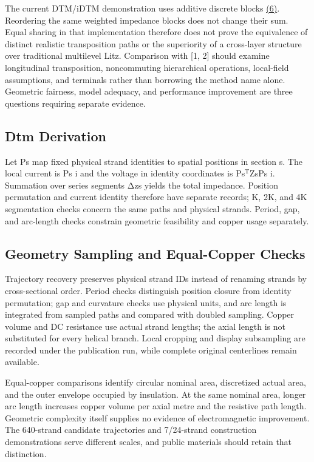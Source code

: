 \documentclass[11pt]{article}
\begin{document}
The current DTM/iDTM demonstration uses additive discrete blocks \href{report_en_single.pdf#E06}{(6)}. Reordering the same weighted impedance blocks does not change their sum. Equal sharing in that implementation therefore does not prove the equivalence of distinct realistic transposition paths or the superiority of a cross-layer structure over traditional multilevel Litz. Comparison with [1, 2] should examine longitudinal transposition, noncommuting hierarchical operations, local-field assumptions, and terminals rather than borrowing the method name alone. Geometric fairness, model adequacy, and performance improvement are three questions requiring separate evidence.


\subsection*{Dtm Derivation}
\hypertarget{05.dtm_derivation.heading}{}
Let Ps map fixed physical strand identities to spatial positions in section s. The local current is Ps i and the voltage in identity coordinates is Ps\(^{\mathrm T}\)ZsPs i. Summation over series segments Δzs yields the total impedance. Position permutation and current identity therefore have separate records; K, 2K, and 4K segmentation checks concern the same paths and physical strands. Period, gap, and arc-length checks constrain geometric feasibility and copper usage separately.


\subsection*{Geometry Sampling and Equal-Copper Checks}
\hypertarget{05.report_geometry.heading}{}
Trajectory recovery preserves physical strand IDs instead of renaming strands by cross-sectional order. Period checks distinguish position closure from identity permutation; gap and curvature checks use physical units, and arc length is integrated from sampled paths and compared with doubled sampling. Copper volume and DC resistance use actual strand lengths; the axial length is not substituted for every helical branch. Local cropping and display subsampling are recorded under the publication run, while complete original centerlines remain available.


Equal-copper comparisons identify circular nominal area, discretized actual area, and the outer envelope occupied by insulation. At the same nominal area, longer arc length increases copper volume per axial metre and the resistive path length. Geometric complexity itself supplies no evidence of electromagnetic improvement. The 640-strand candidate trajectories and 7/24-strand construction demonstrations serve different scales, and public materials should retain that distinction.
\end{document}
